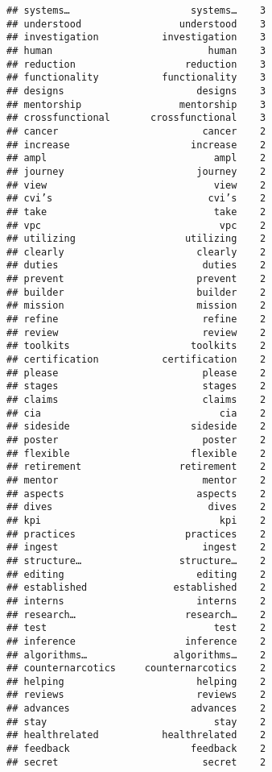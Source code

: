\documentclass[]{article}
\begin{document}
\begin{verbatim}
## systems…                     systems…    3
## understood                 understood    3
## investigation           investigation    3
## human                           human    3
## reduction                   reduction    3
## functionality           functionality    3
## designs                       designs    3
## mentorship                 mentorship    3
## crossfunctional       crossfunctional    3
## cancer                         cancer    2
## increase                     increase    2
## ampl                             ampl    2
## journey                       journey    2
## view                             view    2
## cvi’s                           cvi’s    2
## take                             take    2
## vpc                               vpc    2
## utilizing                   utilizing    2
## clearly                       clearly    2
## duties                         duties    2
## prevent                       prevent    2
## builder                       builder    2
## mission                       mission    2
## refine                         refine    2
## review                         review    2
## toolkits                     toolkits    2
## certification           certification    2
## please                         please    2
## stages                         stages    2
## claims                         claims    2
## cia                               cia    2
## sideside                     sideside    2
## poster                         poster    2
## flexible                     flexible    2
## retirement                 retirement    2
## mentor                         mentor    2
## aspects                       aspects    2
## dives                           dives    2
## kpi                               kpi    2
## practices                   practices    2
## ingest                         ingest    2
## structure…                 structure…    2
## editing                       editing    2
## established               established    2
## interns                       interns    2
## research…                   research…    2
## test                             test    2
## inference                   inference    2
## algorithms…               algorithms…    2
## counternarcotics     counternarcotics    2
## helping                       helping    2
## reviews                       reviews    2
## advances                     advances    2
## stay                             stay    2
## healthrelated           healthrelated    2
## feedback                     feedback    2
## secret                         secret    2

\end{verbatim}
\end{document}
